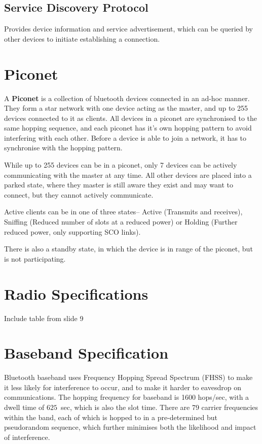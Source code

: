 \subsection*{Service Discovery Protocol}

Provides device information and service advertisement, which can be queried by other devices to initiate establishing a
 connection.

\section*{Piconet}

A \textbf{Piconet} is a collection of bluetooth devices connected in an ad-hoc manner. They form a star network with
 one device acting as the master, and up to 255 devices connected to it as clients. All devices in a piconet are
 synchronised to the same hopping sequence, and each piconet has it's own hopping pattern to avoid interfering with each
 other. Before a device is able to join a network, it has to synchronise with the hopping pattern.

While up to 255 devices can be in a piconet, only 7 devices can be actively communicating with the master at any time.
 All other devices are placed into a parked state, where they master is still aware they exist and may want to connect,
 but they cannot actively communicate.

Active clients can be in one of three states-- Active (Transmits and receives), Sniffing (Reduced number of slots at a
 reduced power) or Holding (Further reduced power, only supporting SCO links).

There is also a standby state, in which the device is in range of the piconet, but is not participating.

\section*{Radio Specifications}

{\Huge Include table from slide 9}

\section*{Baseband Specification}

Bluetooth baseband uses Frequency Hopping Spread Spectrum (FHSS) to make it less likely for interference to occur, and
 to make it harder to eavesdrop on communications. The hopping frequency for baseband is 1600 hops/sec, with a dwell
 time of $625$~{\textmu}sec, which is also the slot time. There are 79 carrier frequencies within the band, each of
 which is hopped to in a pre-determined but pseudorandom sequence, which further minimises both the likelihood and
 impact of interference.

